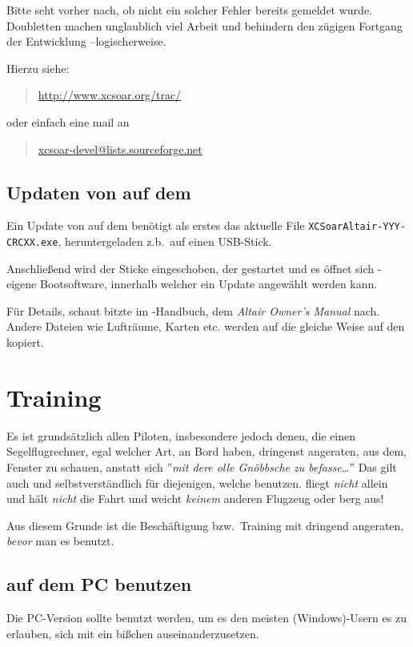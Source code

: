 Bitte seht vorher nach, ob nicht ein solcher Fehler bereits gemeldet wurde.
Doubletten machen unglaublich viel Arbeit und behindern den zügigen Fortgang der Entwicklung --logischerweise.


Hierzu siehe:
\begin{quote}
\url{http://www.xcsoar.org/trac/}
\end{quote}
oder einfach eine mail an
\begin{quote}
\url{xcsoar-devel@lists.sourceforge.net}
\end{quote}

\subsection*{Updaten von \xc auf dem \al}

Ein Update von \xc auf dem \al  benötigt als erstes das aktuelle  File {\tt XCSoarAltair-YYY-CRCXX.exe},
heruntergeladen z.b.\ auf einen USB-Stick.

Anschließend wird der Sticke eingeschoben, der \al gestartet und es öffnet sich \al-eigene Bootsoftware,
innerhalb welcher ein Update angewählt werden kann.

Für Details, schaut bitzte im \al-Handbuch, dem {\em Altair Owner's Manual} nach.
Andere Dateien wie Lufträume, Karten etc. werden auf die gleiche Weise auf den \al kopiert.

\section{Training}
Es ist grundsätzlich allen Piloten,  insbesondere jedoch denen, die einen Segelflugrechner,  egal welcher Art, an Bord haben,
dringenst angeraten, aus dem, Fenster zu schauen, anstatt sich ''{\it mit dere olle Gnöbbsche zu befasse\dots}''
\achtung
Das gilt auch und selbstverständlich für diejenigen, welche \xc benutzen. \xc fliegt {\sl nicht} allein und hält {\sl nicht}
die Fahrt und weicht {\sl keinem}  anderen Flugzeug oder berg aus!

Aus diesem Grunde ist die Beschäftigung bzw.\ Training mit \xc dringend angeraten, {\sl bevor} man es benutzt.


\subsection*{\xc auf dem PC benutzen}
Die PC-Version sollte benutzt werden, um es den meisten (Windows)-Usern es zu erlauben, sich mit \xc ein
bißchen auseinanderzusetzen.

